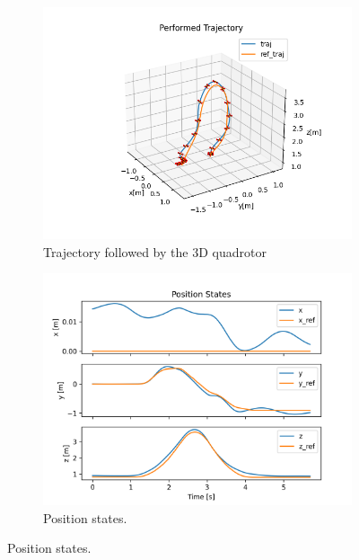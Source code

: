 \documentclass{thesisreport}
\begin{document}
\begin{figure}[H]
	\begin{subfigure}{0.45\textwidth}
		\includegraphics[width=\linewidth]{Images/sil_simulations/performedTraj.png}
		\caption{Trajectory followed by the 3D quadrotor} \label{fig:SIL_3D_flip_3d}
	\end{subfigure}\hspace*{\fill}
	\begin{subfigure}{0.45\textwidth}
		\includegraphics[width=\linewidth]{Images/sil_simulations/posStates.png}
		\caption{Position states.} \label{fig:SIL_3D_flip_pose}
	\end{subfigure}


\end{figure}
\end{document}
